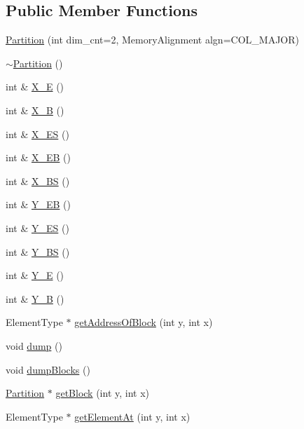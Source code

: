 \subsection*{Public Member Functions}
\begin{DoxyCompactItemize}
\item 
\hyperlink{class_partition_adbdfdfec715a01a053f5c6efeb4e10e3}{Partition} (int dim\_\-cnt=2, MemoryAlignment algn=COL\_\-MAJOR)
\item 
\hyperlink{class_partition_a5e6c9ebcc03fb273e0766abe77954813}{$\sim$Partition} ()
\item 
int \& \hyperlink{class_partition_a74faab4721aa4fa4c17a23c2c7589a1a}{X\_\-E} ()
\item 
int \& \hyperlink{class_partition_ae9748490144ee2cbf5ca2e2fdb355f64}{X\_\-B} ()
\item 
int \& \hyperlink{class_partition_a8d2849bb3bbea837ceca021ce9d6257a}{X\_\-ES} ()
\item 
int \& \hyperlink{class_partition_aae132939e5651020e0801bec2009d300}{X\_\-EB} ()
\item 
int \& \hyperlink{class_partition_a439ac208be8dbee772f9fe167a95581b}{X\_\-BS} ()
\item 
int \& \hyperlink{class_partition_a017cfca75cb8141fb3502d5a90a5e567}{Y\_\-EB} ()
\item 
int \& \hyperlink{class_partition_a618a4ee9a5432087b30e2e6ef4d951ce}{Y\_\-ES} ()
\item 
int \& \hyperlink{class_partition_ad122861c613d170ffb610194b4bb3850}{Y\_\-BS} ()
\item 
int \& \hyperlink{class_partition_a3721344cfda08fbf4f0ee806082d0ac3}{Y\_\-E} ()
\item 
int \& \hyperlink{class_partition_a99642b7ce0d0385ccbaa821918e816f0}{Y\_\-B} ()
\item 
ElementType $\ast$ \hyperlink{class_partition_a22be567d4a5505fa6134221000970704}{getAddressOfBlock} (int y, int x)
\item 
void \hyperlink{class_partition_aeabe76c45c274addb15c435f13c2c7e8}{dump} ()
\item 
void \hyperlink{class_partition_a38087382dbb5c22edcd3671aa65d872b}{dumpBlocks} ()
\item 
\hyperlink{class_partition}{Partition} $\ast$ \hyperlink{class_partition_ac675bc154e0d7fb01bf9db46196165ba}{getBlock} (int y, int x)
\item 
ElementType $\ast$ \hyperlink{class_partition_aad83ba7499b811fd266fdfd97d38204c}{getElementAt} (int y, int x)
\item 

\end{DoxyCompactItemize}
